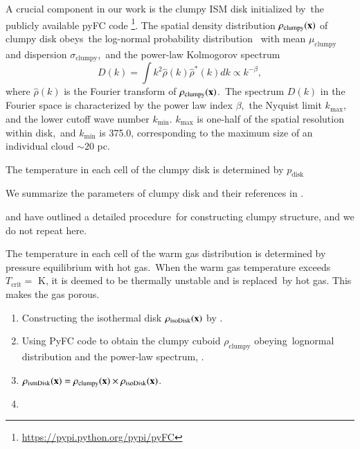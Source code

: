 \documentclass[twocolumn]{aastex631}
\begin{document}
  A crucial component in our work is the clumpy ISM disk initialized by\
  the publicly available pyFC code
  \footnote{\url{https://pypi.python.org/pypi/pyFC}}.
  The spatial density distribution $\rho_{\text{clumpy}}(\bold{x})$ of clumpy disk obeys\
  the log-normal probability distribution\
  with mean $\mu_{\text{clumpy}}$ and dispersion $\sigma_{\text{clumpy}}$,\
  and the power-law Kolmogorov spectrum
  \begin{equation}
    D(k)=\int k^{2} \hat{\rho}(k)\hat{\rho}^{*}(k)dk \propto k^{-\beta},
    \label{Kolmogorov-spectrum}
  \end{equation}
  where $\hat{\rho}(k)$ is the Fourier transform of $\rho_{\text{clumpy}}(\bold{x})$.\
  The spectrum $D(k)$ in the Fourier space is characterized by the power law index $\beta$,\
  the Nyquist limit $k_{\text{max}}$, and the lower cutoff wave number $k_{\text{min}}$.
  $k_{\text{max}}$ is one-half of the spatial resolution within disk,\
  and $k_{\text{min}}$ is 375.0, corresponding to the maximum size of an individual cloud $\sim 20$ pc.\


  The temperature in each cell of the clumpy disk is determined by $p_{\text{disk}}$


  We summarize the parameters of clumpy disk and their references in .



  \citet{LA2002} and \citet{Wagner2012} have outlined a detailed procedure\
  for constructing clumpy structure, and we do not repeat here.


  The temperature in each cell of the warm gas distribution is determined by pressure equilibrium with hot gas.\
  When the warm gas temperature exceeds $T_{\text{crit}}=$ K, it is deemed to be thermally unstable and is replaced\
  by hot gas. This makes the gas porous.


  \begin{enumerate}
     \item Constructing the isothermal disk $\rho_{\text{isoDisk}}(\bold{x})$ by .
     \item Using PyFC code to obtain the clumpy cuboid $\rho_{\text{clumpy}}$ obeying\
           lognormal distribution and the power-law spectrum, .
     \item $\rho_{\text{ismDisk}}(\bf{x}) = \rho_{\text{clumpy}}(\bf{x}) \times \rho_{\text{isoDisk}}(\bf{x})$.
     \item
  \end{enumerate}
\end{document}
